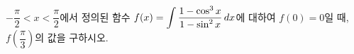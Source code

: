 $-\dfrac{\pi}{2}<x<\dfrac{\pi}{2}$에서 정의된 함수 $f(x)=\displaystyle\int \dfrac{1-\cos^3 x}{1-\sin^2 x}\mkern3mu dx$에 대하여 $f(0)=0$일 때, $f\left(\dfrac{\pi}{3}\right)$의 값을 구하시오.
